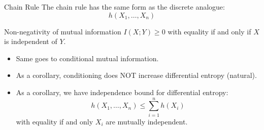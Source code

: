 \documentclass[../main.tex]{subfiles}
\begin{document}
\begin{bbox}{Chain Rule}
    The chain rule has the same form as the discrete analogue: \[
    h(X_1,\dots,X_n)
    \]
\end{bbox}
\begin{bbox}{Non-negativity of mutual information}
    $I(X;Y)\geq 0$ with equality if and only if $X$ is independent of $Y$.
    \begin{itemize}
        \item Same goes to conditional mutual information.
        \item As a corollary, conditioning does NOT increase differential entropy (natural).
        \item As a corollary, we have independence bound for differential entropy: \[
        h(X_1,\dots,X_n)\leq \sum_{i=1}^n h(X_i)
        \] with equality if and only $X_i$ are mutually independent.
    \end{itemize}
\end{bbox}
\end{document}
